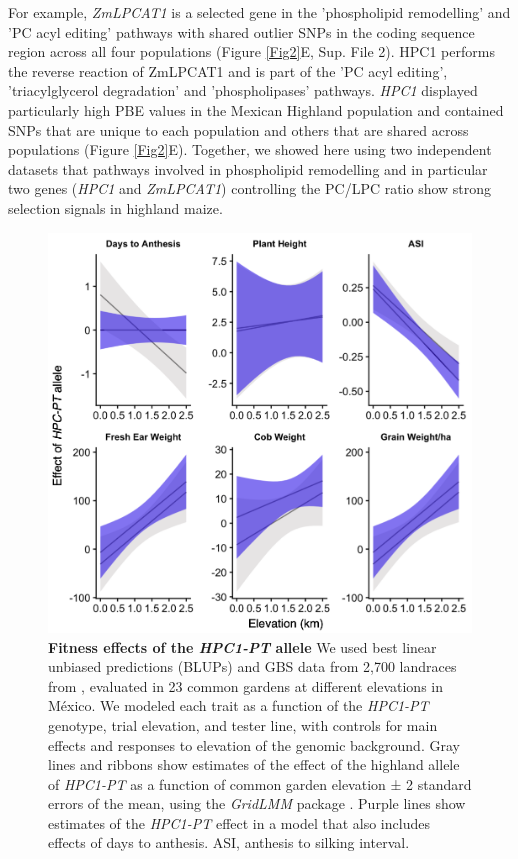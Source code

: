 \documentclass[9pt,twocolumn,twoside,lineno]{BioRxiv}
\begin{document}
For example, \textit{ZmLPCAT1} is a selected gene  in the 'phospholipid remodelling' and 'PC acyl editing' pathways with shared outlier SNPs in the coding sequence region across all four populations (Figure \ref{Fig2}E, Sup. File 2). 
HPC1 performs the reverse reaction of ZmLPCAT1 and is part of the 'PC acyl editing', 'triacylglycerol degradation' and 'phospholipases' pathways. 
\textit{HPC1} displayed particularly high PBE values in the Mexican Highland population and contained SNPs that are unique to each population and others that are shared across populations (Figure \ref{Fig2}E). 
Together, we showed here using two independent datasets that pathways involved in phospholipid remodelling and in particular two genes (\textit{HPC1} and \textit{ZmLPCAT1}) controlling the PC/LPC ratio show strong selection signals in highland maize.

\begin{figure}[!ht]
\begin{center}
\includegraphics[width=0.4\paperwidth]{Figures/Fig_4.png}
\caption{\textbf{Fitness effects of the \textit{HPC1-PT} allele} 
We used best linear unbiased predictions (BLUPs) and GBS data from 2,700 landraces from \cite{Gates2019-xu}, evaluated in 23 common gardens at different elevations in México. 
We modeled each trait as a function of the \textit{HPC1-PT} genotype, trial elevation, and tester line, with controls for main effects and responses to elevation of the genomic background. 
Gray lines and ribbons show estimates of the effect of the highland allele of \textit{HPC1-PT} as a function of common garden elevation ± 2 standard errors of the mean, using the \textit{GridLMM} package \cite{Runcie2019-Gr}. 
Purple lines show estimates of the \textit{HPC1-PT} effect in a model that also includes effects of days to anthesis. ASI, anthesis to silking interval.}
\label{Fig4}
\end{center}
\end{figure}
\end{document}

